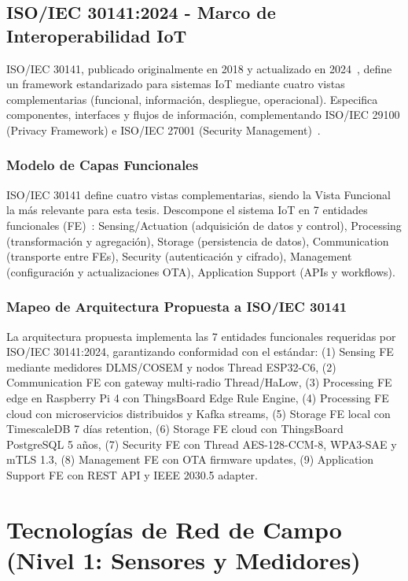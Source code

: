 \subsection{ISO/IEC 30141:2024 - Marco de Interoperabilidad IoT}

ISO/IEC 30141, publicado originalmente en 2018 y actualizado en 2024~\cite{ISOIEC30141v2024}, define un framework estandarizado para sistemas IoT mediante cuatro vistas complementarias (funcional, información, despliegue, operacional). Especifica componentes, interfaces y flujos de información, complementando ISO/IEC 29100 (Privacy Framework) e ISO/IEC 27001 (Security Management)~\cite{ISOIEC30141v2024,tangResearchInteroperabilityIoT}.

\subsubsection{Modelo de Capas Funcionales}

ISO/IEC 30141 define cuatro vistas complementarias, siendo la Vista Funcional la más relevante para esta tesis. Descompone el sistema IoT en 7 entidades funcionales (FE)~\cite{tangResearchInteroperabilityIoT}: Sensing/Actuation (adquisición de datos y control), Processing (transformación y agregación), Storage (persistencia de datos), Communication (transporte entre FEs), Security (autenticación y cifrado), Management (configuración y actualizaciones OTA), Application Support (APIs y workflows).

\subsubsection{Mapeo de Arquitectura Propuesta a ISO/IEC 30141}

La arquitectura propuesta implementa las 7 entidades funcionales requeridas por ISO/IEC 30141:2024, garantizando conformidad con el estándar: (1) Sensing FE mediante medidores DLMS/COSEM y nodos Thread ESP32-C6, (2) Communication FE con gateway multi-radio Thread/HaLow, (3) Processing FE edge en Raspberry Pi 4 con ThingsBoard Edge Rule Engine, (4) Processing FE cloud con microservicios distribuidos y Kafka streams, (5) Storage FE local con TimescaleDB 7 días retention, (6) Storage FE cloud con ThingsBoard PostgreSQL 5 años, (7) Security FE con Thread AES-128-CCM-8, WPA3-SAE y mTLS 1.3, (8) Management FE con OTA firmware updates, (9) Application Support FE con REST API y IEEE 2030.5 adapter.

\section{Tecnologías de Red de Campo (Nivel 1: Sensores y Medidores)}

